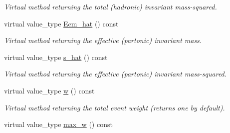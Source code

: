 \begin{DoxyCompactItemize}
\begin{DoxyCompactList}\small\item\em Virtual method returning the total (hadronic) invariant mass-\/squared. \end{DoxyCompactList}\item 
virtual value\-\_\-type \hyperlink{a00442_a42bcfbb7c8fcb5444f0cf3ab4259d8cc}{Ecm\-\_\-hat} () const 
\begin{DoxyCompactList}\small\item\em Virtual method returning the effective (partonic) invariant mass. \end{DoxyCompactList}\item 
\hypertarget{a00442_a00ba806004e8b703ae16876d25de0424}{virtual value\-\_\-type \hyperlink{a00442_a00ba806004e8b703ae16876d25de0424}{s\-\_\-hat} () const }\label{a00442_a00ba806004e8b703ae16876d25de0424}

\begin{DoxyCompactList}\small\item\em Virtual method returning the effective (partonic) invariant mass-\/squared. \end{DoxyCompactList}\item 
\hypertarget{a00442_ae452c2c9e82b6e784bd32618c81d5ab1}{virtual value\-\_\-type \hyperlink{a00442_ae452c2c9e82b6e784bd32618c81d5ab1}{w} () const }\label{a00442_ae452c2c9e82b6e784bd32618c81d5ab1}

\begin{DoxyCompactList}\small\item\em Virtual method returning the total event weight (returns one by default). \end{DoxyCompactList}\item 
\hypertarget{a00442_ac50bcb2c604b7cd12da4f27ef3fb4414}{virtual value\-\_\-type \hyperlink{a00442_ac50bcb2c604b7cd12da4f27ef3fb4414}{max\-\_\-w} () const }\label{a00442_ac50bcb2c604b7cd12da4f27ef3fb4414}


\end{DoxyCompactItemize}
